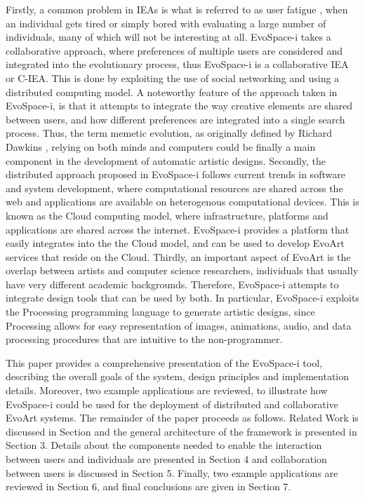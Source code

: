 \documentclass{sig-alternate}
\begin{document}
Firstly, a common problem in IEAs is what is referred to as user fatigue \cite{ie1}, when an individual gets tired or simply bored with evaluating a large number of individuals,
many of which will not be interesting at all.
EvoSpace-i takes a collaborative approach, where preferences of multiple users are considered and integrated into the evolutionary process,
thus EvoSpace-i is a collaborative IEA or C-IEA.
This is done by exploiting the use of social networking and using a distributed computing model.
A noteworthy feature of the approach taken in EvoSpace-i, is that it attempts to integrate the way creative elements are shared between users,
and how different preferences are integrated into a single search process.
Thus, the term memetic evolution, as originally defined by Richard Dawkins \cite{r.dawkins1976the-selfish-gen}, relying on both minds and computers
could be finally a main component in the development of automatic artistic designs.
Secondly, the distributed approach proposed in EvoSpace-i follows current trends in software and system development,
where computational resources are shared across the web and applications are available on heterogenous computational devices.
This is known as the Cloud computing model, where infrastructure, platforms and applications are shared across the internet.
EvoSpace-i provides a platform that easily integrates into the the Cloud model, and can be used to develop EvoArt services that reside on the Cloud.
Thirdly, an important aspect of EvoArt is the overlap between artists and computer science researchers, individuals that usually have very different
academic backgrounds. Therefore, EvoSpace-i attempts to integrate design tools that can be used by both.
In particular, EvoSpace-i exploits the Processing programming language to generate artistic designs,
since Processing allows for easy representation of images, animations, audio, and data processing procedures that are intuitive to the non-programmer.


This paper provides a comprehensive presentation of the EvoSpace-i tool, describing the overall goals of the system,
design principles and implementation details.
Moreover, two example applications are reviewed, to illustrate how EvoSpace-i could be used for the deployment of distributed and collaborative EvoArt systems.
The remainder of the paper proceeds as follows. Related Work is discussed in Section  and the general architecture of the framework is presented in Section 3.
Details about the components needed to enable the interaction between users and individuals are presented in Section 4 and collaboration between users is discussed in Section 5.
Finally, two example applications are reviewed in Section 6, and final conclusions are given in Section 7.
\end{document}
